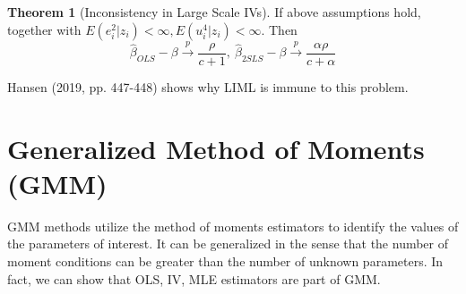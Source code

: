 \documentclass[12pt]{article}
\theoremstyle{definition}
\theoremstyle{property}
\theoremstyle{assumption}
\theoremstyle{example}
\theoremstyle{comment}
\newtheorem{theorem}{Theorem}[section]
\begin{document}
\begin{mdframed}[backgroundcolor=blue!5] 
\begin{theorem}[Inconsistency in Large Scale IVs]
If above assumptions hold, together with $E(e_i^2|z_i)<\infty, E(u_i^4|z_i)<\infty$. Then 
\[
\hat{\beta}_{OLS}-\beta\xrightarrow{p}\frac{\rho}{c+1},\   \hat{\beta}_{2SLS}-\beta\xrightarrow{p}\frac{\alpha\rho}{c+\alpha}
\]
\end{theorem}
\end{mdframed}
Hansen (2019, pp. 447-448) shows why LIML is immune to this problem. 
\section{Generalized Method of Moments (GMM)}
GMM methods utilize the method of moments estimators to identify the values of the parameters of interest. It can be generalized in the sense that the number of moment conditions can be greater than the number of unknown parameters. In fact, we can show that OLS, IV, MLE estimators are part of GMM. 
\end{document}
